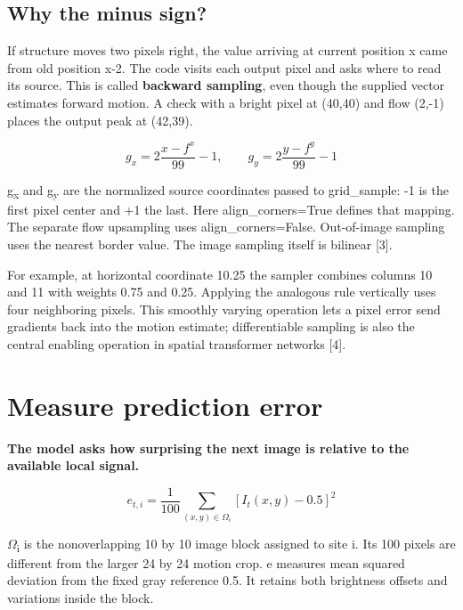 \documentclass[11pt,letterpaper]{article}
\begin{document}
\subsection*{Why the minus sign?}

If structure moves two pixels right, the value arriving at current position x came from old position x-2. The code visits each output pixel and asks where to read its source. This is called \textbf{backward sampling}, even though the supplied vector estimates forward motion. A check with a bright pixel at (40,40) and flow (2,-1) places the output peak at (42,39).


\begin{equation}g_x=2\frac{x-f^x}{99}-1,\qquad g_y=2\frac{y-f^y}{99}-1\end{equation}

g\textsubscript{x} and g\textsubscript{y} are the normalized source coordinates passed to grid\_sample: -1 is the first pixel center and +1 the last. Here align\_corners=True defines that mapping. The separate flow upsampling uses align\_corners=False. Out-of-image sampling uses the nearest border value. The image sampling itself is bilinear [3].


For example, at horizontal coordinate 10.25 the sampler combines columns 10 and 11 with weights 0.75 and 0.25. Applying the analogous rule vertically uses four neighboring pixels. This smoothly varying operation lets a pixel error send gradients back into the motion estimate; differentiable sampling is also the central enabling operation in spatial transformer networks [4].


\clearpage

\section{Measure prediction error}\label{sec10}

\textbf{The model asks how surprising the next image is relative to the available local signal.}


\begin{equation}e_{t,i}=\frac1{100}\sum_{(x,y)\in\Omega_i}[I_t(x,y)-0.5]^2\end{equation}

\(\Omega\)\textsubscript{i} is the nonoverlapping 10 by 10 image block assigned to site i. Its 100 pixels are different from the larger 24 by 24 motion crop. e measures mean squared deviation from the fixed gray reference 0.5. It retains both brightness offsets and variations inside the block.
\end{document}
